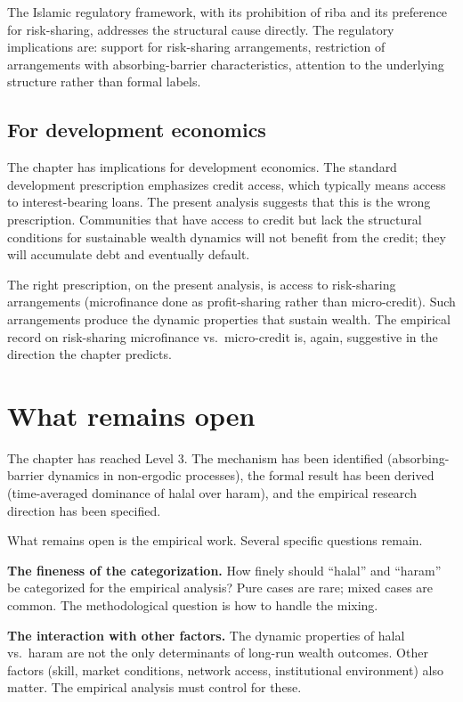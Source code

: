 The Islamic regulatory framework, with its prohibition of riba and
its preference for risk-sharing, addresses the structural cause
directly. The regulatory implications are: support for risk-sharing
arrangements, restriction of arrangements with absorbing-barrier
characteristics, attention to the underlying structure rather than
formal labels.

\subsection{For development economics}

The chapter has implications for development economics. The
standard development prescription emphasizes credit access, which
typically means access to interest-bearing loans. The present
analysis suggests that this is the wrong prescription. Communities
that have access to credit but lack the structural conditions for
sustainable wealth dynamics will not benefit from the credit;
they will accumulate debt and eventually default.

The right prescription, on the present analysis, is access to
risk-sharing arrangements (microfinance done as profit-sharing
rather than micro-credit). Such arrangements produce the dynamic
properties that sustain wealth. The empirical record on
risk-sharing microfinance vs.\ micro-credit is, again, suggestive
in the direction the chapter predicts.

\section{What remains open}
\label{sec:halal-open}

The chapter has reached Level 3. The mechanism has been identified
(absorbing-barrier dynamics in non-ergodic processes), the formal
result has been derived (time-averaged dominance of halal over
haram), and the empirical research direction has been specified.

What remains open is the empirical work. Several specific questions
remain.

\textbf{The fineness of the categorization.} How finely should
``halal'' and ``haram'' be categorized for the empirical analysis?
Pure cases are rare; mixed cases are common. The methodological
question is how to handle the mixing.

\textbf{The interaction with other factors.} The dynamic
properties of halal vs.\ haram are not the only determinants of
long-run wealth outcomes. Other factors (skill, market conditions,
network access, institutional environment) also matter. The
empirical analysis must control for these.

